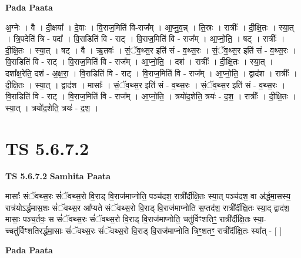\documentclass[17pt]{extarticle}
\begin{document}
\textbf{Pada Paata} \newline

अ॒ग्नेः । वै । दी॒क्षया᳚ । दे॒वाः । वि॒राज॒मिति॑ वि-राज᳚म् । आ॒प्नु॒व॒न्न् । ति॒स्रः । रात्रीः᳚ । दी॒क्षि॒तः । स्या॒त् । त्रि॒पदेति॑ त्रि - पदा᳚ । वि॒राडिति॑ वि - राट् । वि॒राज॒मिति॑ वि - राज᳚म् । आ॒प्नो॒ति॒ । षट् । रात्रीः᳚ । दी॒क्षि॒तः । स्या॒त् । षट् । वै । ऋ॒तवः॑ । सं॒ॅव॒थ्स॒र इति॑ सं - व॒थ्स॒रः । सं॒ॅव॒थ्स॒र इति॑ सं - व॒थ्स॒रः । वि॒राडिति॑ वि - राट् । वि॒राज॒मिति॑ वि - राज᳚म् । आ॒प्नो॒ति॒ । दश॑ । रात्रीः᳚ । दी॒क्षि॒तः । स्या॒त् । दशा᳚क्ष॒रेति॒ दश॑ - अ॒क्ष॒रा॒ । वि॒राडिति॑ वि - राट् । वि॒राज॒मिति॑ वि - राज᳚म् । आ॒प्नो॒ति॒ । द्वाद॑श । रात्रीः᳚ । दी॒क्षि॒तः । स्या॒त् । द्वाद॑श । मासाः᳚ । सं॒ॅव॒थ्स॒र इति॑ सं - व॒थ्स॒रः । सं॒ॅव॒थ्स॒र इति॑ सं - व॒थ्स॒रः । वि॒राडिति॑ वि - राट् । वि॒राज॒मिति॑ वि - राज᳚म् । आ॒प्नो॒ति॒ । त्रयो॑द॒शेति॒ त्रयः॑ - द॒श॒ । रात्रीः᳚ । दी॒क्षि॒तः । स्या॒त् । त्रयो॑द॒शेति॒ त्रयः॑ - द॒श॒ ।  \newline





\section{ TS 5.6.7.2 }

\textbf{TS 5.6.7.2 } \newline
\textbf{Samhita Paata} \newline

मासाः᳚ संॅवथ्स॒रः सं॑ॅवथ्स॒रो वि॒राड् वि॒राज॑माप्नोति॒ पञ्च॑दश॒ रात्री᳚र्दीक्षि॒तः स्या॒त् पञ्च॑दश॒ वा अ॑र्द्धमा॒सस्य॒ रात्र॑योऽर्द्धमास॒शः सं॑ॅवथ्स॒र आ᳚प्यते संॅवथ्स॒रो वि॒राड् वि॒राज॑माप्नोति स॒प्तद॑श॒ रात्री᳚र्दीक्षि॒तः स्या॒द् द्वाद॑श॒ मासाः॒ पञ्च॒र्तवः॒ स सं॑ॅवथ्स॒रः सं॑ॅवथ्स॒रो वि॒राड् वि॒राज॑माप्नोति॒ चतु॑र्विꣳशतिꣳ॒॒ रात्री᳚र्दीक्षि॒तः स्या॒-च्चतु॑र्विꣳशतिरर्द्धमा॒साः सं॑ॅवथ्स॒रः सं॑ॅवथ्स॒रो वि॒राड् वि॒राज॑माप्नोति त्रिꣳ॒॒शतꣳ॒॒ रात्री᳚र्दीक्षि॒तः स्या᳚त् - [  ] \newline

\textbf{Pada Paata} \newline
\end{document}

